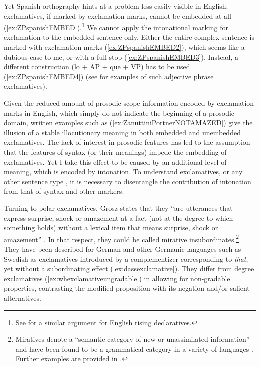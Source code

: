 Yet Spanish orthography hints at a 
problem less easily visible in English: exclamatives, if marked by 
exclamation marks, cannot be embedded at all 
(\ref{ex:ZPspanishEMBED}).\footnote{See \citet[244]{FarkasRoelofsen.2017} for a similar argument for English rising declaratives.} We cannot apply the 
intonational marking for exclamation to the embedded sentence only. Either the entire complex sentence is marked with exclamation marks (\ref{ex:ZPspanishEMBED2}), which seems like a dubious case to me, or with a full stop (\ref{ex:ZPspanishEMBED3}). Instead, a different construction (lo + \ac{AP} + que + VP) has to be used 
(\ref{ex:ZPspanishEMBED4}) (see \cite[229]{GarciaGarcia.2018} 
for examples of such adjective phrase exclamatives).

\begin{exe}
\end{exe}

Given the reduced amount of prosodic scope information encoded by 
exclamation marks in English, which simply do not indicate the beginning 
of a prosodic domain, written examples such as 
(\ref{ex:ZanuttiniPortnerNOTAMAZED}) give the illusion of a stable 
illocutionary meaning in both embedded and unembedded exclamatives. The lack 
of interest in prosodic features has led to the assumption that the features of syntax (or their meanings) impede the embedding of exclamatives. Yet I take this effect to be caused by an additional level of meaning, which is encoded by intonation. To understand exclamatives, or any other sentence type \citep{Reich.2008}, it is necessary to disentangle the contribution of intonation from that of syntax and other markers.

Turning to polar exclamatives, Grosz states that they ``are utterances that express surprise, shock or amazement at a fact (not at the degree to which something holds) without a lexical item that means surprise, shock or amazement'' \citep[25]{Grosz.2012}. In that respect, they could be called mirative insubordinates.\footnote{Miratives denote a ``semantic category of new or unassimilated information'' \citep[533]{DeLancey.2012} and have been found to be a grammatical category in a variety of languages \citep{HengeveldOlbertz.2012}. Further examples are provided in .} They have been described for German and other Germanic languages such as Swedish as exclamatives introduced by a complementizer corresponding to \textit{that}, yet without a subordinating effect (\ref{ex:dassexclamative}). They differ from degree exclamatives (\ref{ex:whexclamativeungradable}) in allowing for non-gradable properties, contrasting the modified proposition with its negation and/or salient alternatives.

